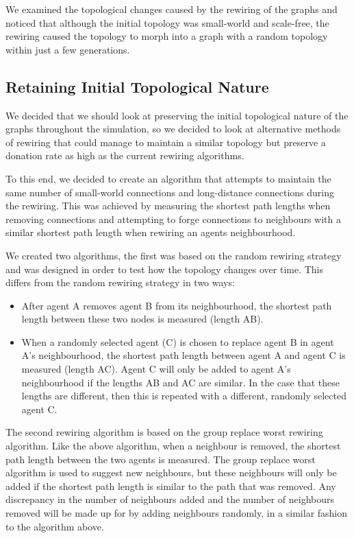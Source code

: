 We examined the topological changes caused by the rewiring of the graphs and noticed that although the initial topology was small-world and scale-free, the rewiring caused the topology to morph into a graph with a random topology within just a few generations.

\subsection{Retaining Initial Topological Nature}

We decided that we should look at preserving the initial topological nature of the graphs throughout the simulation, so we decided to look at alternative methods of rewiring that could manage to maintain a similar topology but preserve a donation rate as high as the current rewiring algorithms.

To this end, we decided to create an algorithm that attempts to maintain the same number of small-world connections and long-distance connections during the rewiring. This was achieved by measuring the shortest path lengths when removing connections  and attempting to forge connections to neighbours with a similar shortest path length when rewiring an agents neighbourhood.

We created two algorithms, the first was based on the random rewiring strategy and was designed in order to test how the topology changes over time. This differs from the random rewiring strategy in two ways:
\begin{itemize}
	\item After agent A removes agent B from its neighbourhood, the shortest path length between these two nodes is measured (length AB).
	\item When a randomly selected agent (C) is chosen to replace agent B in agent A's neighbourhood, the shortest path length between agent A and agent C is measured (length AC). Agent C will only be added to agent A's neighbourhood if the lengths AB and AC are similar. In the case that these lengths are different, then this is repeated with a different, randomly selected agent C.
\end{itemize}

The second rewiring algorithm is based on the group replace worst rewiring algorithm.
Like the above algorithm, when a neighbour is removed, the shortest path length between the two agents is measured.
The group replace worst algorithm is used to suggest new neighbours, but these neighbours will only be added if the shortest path length is similar to the path that was removed. Any discrepancy in the number of neighbours added and the number of neighbours removed will be made up for by adding neighbours randomly, in a similar fashion to the algorithm above.

